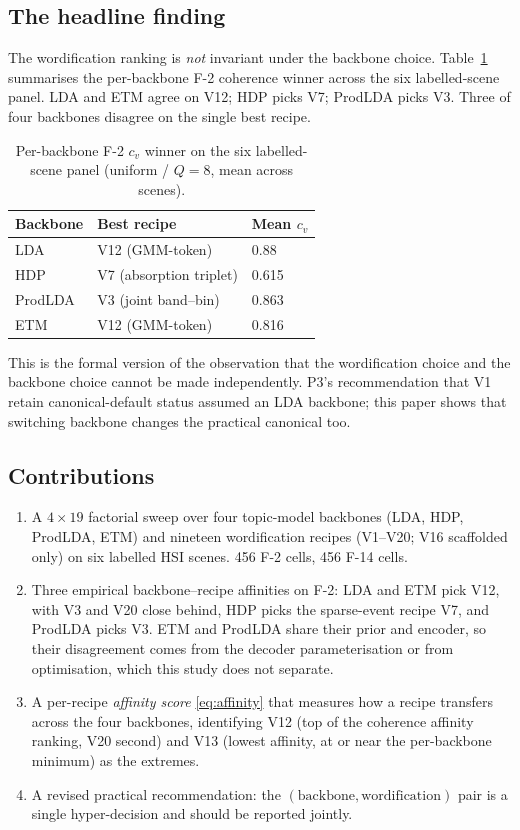 \documentclass[journal,a4paper,10pt]{IEEEtran}
\begin{document}
\subsection{The headline finding}
\label{subsec:headline}
The wordification ranking is \emph{not} invariant under the backbone
choice. Table~\ref{tab:headline} summarises the per-backbone F-2
coherence winner across the six labelled-scene panel. LDA and ETM agree
on V12; HDP picks V7; ProdLDA picks V3. Three of four backbones
disagree on the single best recipe.

\begin{table}[ht]
\caption{Per-backbone F-2 $c_v$ winner on the six labelled-scene panel
(uniform / $Q=8$, mean across scenes).}
\label{tab:headline}
\centering
\small
\begin{tabular}{lll}
\toprule
Backbone & Best recipe & Mean $c_v$ \\
\midrule
LDA      & V12 (GMM-token) & 0.88 \\
HDP      & V7 (absorption triplet) & 0.615 \\
ProdLDA  & V3 (joint band--bin) & 0.863 \\
ETM      & V12 (GMM-token) & 0.816 \\
\bottomrule
\end{tabular}
\end{table}

This is the formal version of the observation that the wordification
choice and the backbone choice cannot be made independently. P3's
recommendation that V1 retain canonical-default status assumed an LDA
backbone; this paper shows that switching backbone changes
the practical canonical too.

\subsection{Contributions}
\label{subsec:contributions}
\begin{enumerate}
  \item A $4 \times 19$ factorial sweep over four topic-model
    backbones (LDA, HDP, ProdLDA, ETM) and nineteen wordification
    recipes (V1--V20; V16 scaffolded only) on six labelled HSI scenes.
    456 F-2 cells, 456 F-14 cells.
  \item Three empirical backbone--recipe affinities on F-2: LDA and
    ETM pick V12, with V3 and V20 close behind, HDP picks the
    sparse-event recipe V7, and ProdLDA picks V3. ETM and ProdLDA share their prior and encoder,
    so their disagreement comes from the decoder parameterisation or
    from optimisation, which this study does not separate.
  \item A per-recipe \emph{affinity score} \eqref{eq:affinity} that
    measures how a recipe transfers across the four backbones,
    identifying V12 (top of the coherence affinity ranking, V20 second)
    and V13 (lowest affinity, at or near the per-backbone minimum) as the
    extremes.
  \item A revised practical recommendation: the
    $(\text{backbone}, \text{wordification})$ pair is a single
    hyper-decision and should be reported jointly.
\end{enumerate}
\end{document}

